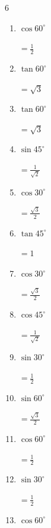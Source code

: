 \begin{multicols}{6}
\begin{enumerate}
        $\displaystyle =\frac{\sqrt{3}}{2}$

  \item $\displaystyle \cos{60^\circ}$

        $\displaystyle =\frac{1}{2}$

  \item $\displaystyle \tan{60^\circ}$

        $\displaystyle =\sqrt{3}$

  \item $\displaystyle \tan{60^\circ}$

        $\displaystyle =\sqrt{3}$

  \item $\displaystyle \sin{45^\circ}$

        $\displaystyle =\frac{1}{\sqrt{2}}$

\columnbreak %

  \item $\displaystyle \cos{30^\circ}$

        $\displaystyle =\frac{\sqrt{3}}{2}$

  \item $\displaystyle \tan{45^\circ}$

        $\displaystyle =1$

  \item $\displaystyle \cos{30^\circ}$

        $\displaystyle =\frac{\sqrt{3}}{2}$

  \item $\displaystyle \cos{45^\circ}$

        $\displaystyle =\frac{1}{\sqrt{2}}$

  \item $\displaystyle \sin{30^\circ}$

        $\displaystyle =\frac{1}{2}$

  \item $\displaystyle \sin{60^\circ}$

        $\displaystyle =\frac{\sqrt{3}}{2}$

  \item $\displaystyle \cos{60^\circ}$

        $\displaystyle =\frac{1}{2}$

  \item $\displaystyle \sin{30^\circ}$

        $\displaystyle =\frac{1}{2}$

  \item $\displaystyle \cos{60^\circ}$


\end{enumerate}
\end{multicols}
